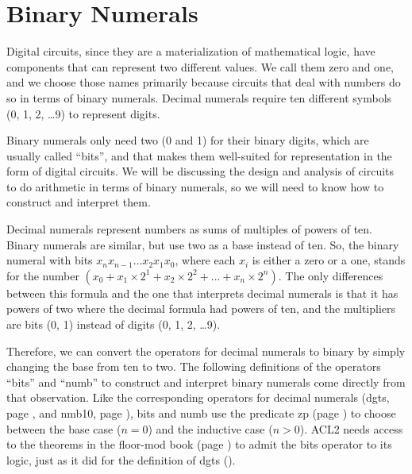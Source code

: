 \section{Binary Numerals}
\label{sec:binary-numerals}

Digital circuits, since they are a materialization of mathematical logic,
have components that can represent two different values.
We call them zero and one, and we choose those names primarily
because circuits that deal with numbers do so in terms of binary numerals.
Decimal numerals require ten different symbols (0, 1, 2, \dots 9)
to represent digits.

Binary numerals only need two (0 and 1) for their binary digits,
which are usually called ``bits'', and that makes them well-suited
for representation in the form of digital circuits.
We will be discussing the design and analysis of circuits to do
arithmetic in terms of binary numerals, so we will need to know
how to construct and interpret them.

Decimal numerals represent numbers as sums of multiples of powers of ten.
Binary numerals are similar, but use two as a base instead of ten.
So, the binary numeral with bits $x_nx_{n-1}\dots x_2x_1x_0$,
where each $x_i$ is either a zero or a one, stands for the number
$(x_0 + x_1 \times 2^1 + x_2 \times 2^2 + \dots + x_{n} \times 2^{n})$.
The only differences between this formula and the one that interprets
decimal numerals is that it has powers of two where the decimal formula had
powers of ten, and the multipliers are bits (0, 1) instead of
digits (0, 1, 2, \dots 9).

Therefore, we can convert the operators for decimal numerals to binary
by simply changing the base from ten to two.
The following definitions of the operators ``bits'' and ``numb''
to construct and interpret binary numerals come directly
from that observation.
Like the corresponding operators for decimal numerals
(dgts, page \pageref{dgts-defun}, and nmb10, page \pageref{nmb10-defun}),
bits and numb use the predicate zp (page \pageref{zp-def}) to choose
between the base case ($n = 0$) and the inductive case ($n > 0$).
ACL2 needs access to the theorems
in the floor-mod book (page \pageref{floor-mod-book})
to admit the bits operator to its logic,
just as it did for the definition of dgts (\pageref{dgts-defun}).

